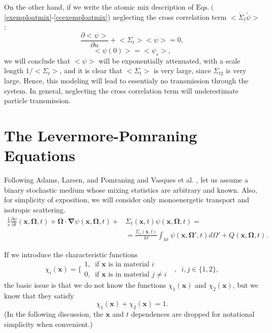 \documentclass[12pt]{article}
\newcommand{\bl}{\big<}
\newcommand{\bg}{\big>}
\newcommand{\n}{ \noindent}
\begin{document}
\n On the other hand, if we write the atomic mix description of $\textrm{Eqs.}\ ($\ref{exemploatmix}-\ref{ccexemploatmix}) neglecting the cross correlation term $\bl\tilde\Sigma_t\tilde\psi\bg$:
\begin{equation}
\frac{\partial\bl\psi\bg}{\partial u}+\bl\Sigma_t\bg\bl\psi\bg=0,
\end{equation}
\begin{equation}
\bl\psi(0)\bg = \bl\psi_s\bg,
\end{equation}
\n we will conclude that $\bl\psi\bg$ will be exponentially attenuated, with a scale length $1/\bl\Sigma_t\bg$, and it is clear that $\bl\Sigma_t\bg$ is very large, since $\Sigma_{t2}$ is very large.
Hence, this modeling will lead to essentialy no transmission through the system.
In general, neglecting the cross correlation term will underestimate particle transmission.

\section*{The Levermore-Pomraning Equations}

Following Adams, Larsen, and Pomraning \cite{adams_89} and Vasques et al. \cite{vasques_04}, let us assume a binary stochastic medium whose mixing statistics are arbitrary and known.
Also, for simplicity of exposition, we will consider only monoenergetic transport and isotropic scattering.
\begin{equation}\label{1.1}
\begin{split}
\frac{1}{v}\frac{\partial \psi}{\partial t}(\bm x,\bm\Omega,t) + \bm\Omega\cdot \bm\nabla
 \psi (\bm x,\bm\Omega,t) + &\Sigma_t(\bm x, t)\psi(\bm x,\bm\Omega,t) =
\\& = \frac{\Sigma_s(\bm x, t)}{4\pi}\int_{4\pi}\psi(\bm x,\bm\Omega',t)d\Omega' +
Q(\bm x,\bm \Omega, t).
\end{split}
\end{equation}

 If we introduce the characteristic functions
\begin{equation}\label{2.1}
\chi_i(\bm x) =
\Bigg\{
\begin{array}{l}
1, \;\;\textrm{if $\bm x$ is in material $i$}
\\ 0, \;\; \textrm{if $\bm x$ is in material $j\not=i$ }
\end{array},
\;\; i,j\in\{1,2\},
\end{equation}
the basic issue is that we do not know the functions $\chi_1(\bm x)$ and $\chi_2(\bm x)$, but we know that they satisfy
\begin{equation}\label{2.2}
\chi_1(\bm x)+\chi_2(\bm x) = 1.
\end{equation}
 (In the following discussion, the $\bm x$ and $t$ dependences are dropped for notational simplicity when convenient.)
\end{document}
